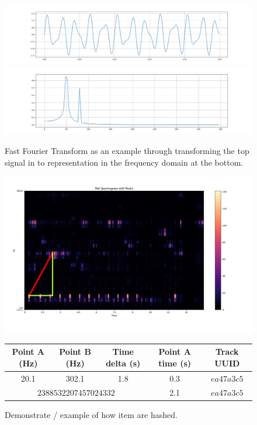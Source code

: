 \begin{figure}
    \centering
    \includegraphics[scale=0.2]{figures/FourierTransform.png}
    \includegraphics[scale=0.2]{figures/FourierTransformed.png}
    \caption{Fast Fourier Transform as an example through transforming the top signal in to representation in the frequency domain at the bottom.}
    \label{fig:fft}
\end{figure}



\begin{figure}
    \centering
    \includegraphics[scale=0.2]{figures/Delta_distance_demo.png}
    \caption{}
    \label{fig:pairspicking}
\end{figure}

\begin{figure}
    \centering
    \small
        \begin{tabular}{|c|c|c|c|c|}
            \hline
            Point A (Hz) & Point B (Hz) & Time delta (s) & Point A time (s) & Track UUID \\
            \hline
            20.1 & 302.1 & 1.8 & 0.3 & $ea47a3c5$\\
            \hline
            \multicolumn{3}{|c|}{$2388532207457024332$} & 2.1 & $ea47a3c5$\\
            \hline
        \end{tabular}
    \caption{Demonstrate / example of how item are hashed. \cite{macleod_abracadabra_nodate}}
    \label{fig:hash}
\end{figure}
